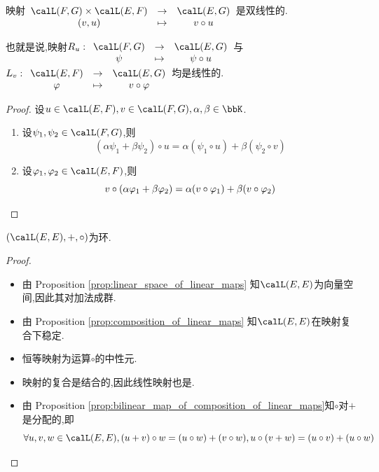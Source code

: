 \begin{prop} \label{prop:bilinear_map_of_composition_of_linear_maps}
    映射$\begin{array}[t]{ccc} \calL(F, G) \times \calL(E, F) & \to & \calL(E, G) \\
    (v, u) & \tp & v \circ u \end{array}$是双线性的.

    也就是说,映射$R_u: \begin{array}[t]{ccc} \calL(F, G) & \to & \calL(E, G) \\
    \psi & \tp & \psi \circ u \end{array}$与$L_v: \begin{array}[t]{ccc} \calL(E, F) &
    \to & \calL(E, G) \\ \varphi & \tp & v \circ \varphi \end{array}$均是线性的.
\end{prop}

\begin{proof}
    设$u \in \calL(E, F), v \in \calL(F, G), \alpha, \beta \in \bbK$.

    \begin{enumerate}
        \item 设$\psi_1, \psi_2 \in \calL(F, G)$,则\[ (\alpha \psi_1 + \beta \psi_2) \circ u =
            \alpha (\psi_1 \circ u) + \beta (\psi_2 \circ v) \]
        \item 设$\varphi_1, \varphi_2 \in \calL(E, F)$,则\[ v \circ (\alpha \varphi_1 + \beta \varphi_2) =
            \alpha (v \circ \varphi_1) + \beta (v \circ \varphi_2) \qedhere \]
    \end{enumerate}
\end{proof}

\begin{prop}
    $(\calL(E, E), +, \circ)$为环.
\end{prop}

\begin{proof} $\ $
    \begin{itemize}
        \item 由 Proposition \ref{prop:linear_space_of_linear_maps} 知$\calL(E, E)$为向量空间,因此其对加法成群.
        \item 由 Proposition \ref{prop:composition_of_linear_maps} 知$\calL(E, E)$在映射复合下稳定.
        \item 恒等映射为运算$\circ$的中性元.
        \item 映射的复合是结合的,因此线性映射也是.
        \item 由 Proposition \ref{prop:bilinear_map_of_composition_of_linear_maps}知$\circ$对$+$是分配的,即
            \[ \forall u, v, w \in \calL(E, E), (u + v) \circ w = (u \circ w) + (v \circ w), u \circ (v + w) =
            (u \circ v) + (u \circ w) \qedhere \]
    \end{itemize}
\end{proof}

